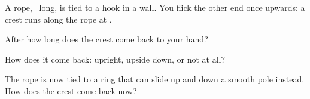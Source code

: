 A rope, \LrO\ long, is tied to a hook in a wall. You flick the other end once upwards: a crest runs along the rope at \vO.

\begin{abcliste}
\abc After how long does the crest come back to your hand?

\abc How does it come back: upright, upside down, or not at all?

\abc The rope is now tied to a ring that can slide up and down a smooth pole instead. How does the crest come back now?
\end{abcliste}
